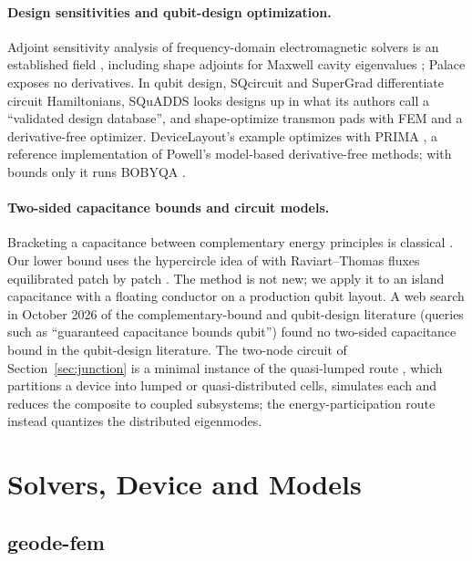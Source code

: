 \documentclass{anvil-paper}
\begin{document}
\paragraph{Design sensitivities and qubit-design optimization.}
Adjoint sensitivity analysis of frequency-domain electromagnetic solvers is
an established field \citep{nikolova2004adjoint}, including shape adjoints
for Maxwell cavity eigenvalues \citep{akcelik2005adjoint}; Palace exposes no
derivatives.
In qubit design, SQcircuit \citep{rajabzadeh2023analysis} and
SuperGrad \citep{wang2025supergrad} differentiate circuit Hamiltonians,
SQuADDS \citep{shanto2024squadds} looks designs up in what its authors
call a ``validated design database'', and \citet{eun2023shape} shape-optimize transmon pads with FEM
and a derivative-free optimizer.
DeviceLayout's example optimizes with PRIMA \citep{zhang2023prima}, a
reference implementation of Powell's model-based derivative-free methods;
with bounds only it runs BOBYQA \citep{powell2009bobyqa}.

\paragraph{Two-sided capacitance bounds and circuit models.}
Bracketing a capacitance between complementary energy principles is
classical \citep{specogna2011complementary}. Our lower bound uses the
hypercircle idea of \citet{prager1947approximations} with Raviart--Thomas
fluxes \citep{raviart1977mixed} equilibrated patch by patch
\citep{braess2007equilibrated,ern2015polynomial}. The method is not new; we
apply it to an island capacitance with a floating conductor on a
production qubit layout. A web search in October 2026 of the
complementary-bound and qubit-design literature (queries such as
``guaranteed capacitance bounds qubit'') found no two-sided capacitance
bound in the qubit-design literature. The two-node circuit of Section~\ref{sec:junction} is a minimal instance of
the quasi-lumped route \citep{minev2021circuit}, which partitions a device
into lumped or quasi-distributed cells, simulates each and reduces the
composite to coupled subsystems; the energy-participation route
\citep{minev2021energy} instead quantizes the distributed eigenmodes.

\section{Solvers, Device and Models}
\label{sec:setup}

\subsection{geode-fem}
\label{sec:architecture}
\end{document}
